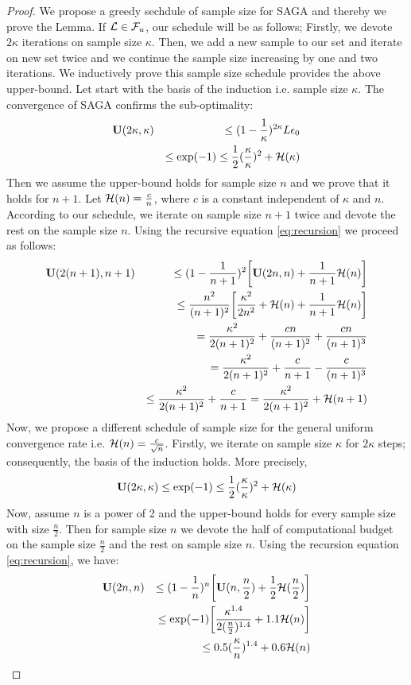 \begin{proof}
	We propose a greedy sechdule of sample size for SAGA and thereby we prove
	the Lemma. If ${\cal L} \in {\cal F}_{u}$, our schedule will be as follows;
	Firstly, we devote $2 \kappa$ iterations on sample size $\kappa$. Then, we
	add a new sample to our set and iterate on new set twice and we continue the
	sample size increasing by one and two iterations. We inductively prove this
	sample size schedule provides the above upper-bound. Let start with the basis
	of the induction i.e. sample size $\kappa$. The convergence of SAGA confirms
	the sub-optimality: 
	\begin{eqnarray*}
		& \mathbf U(2\kappa,\kappa) & \leq (1-\frac{1}{\kappa})^{2\kappa} L \epsilon_0 \\
		& & \leq \exp(-1) \leq \frac{1}{2}(\frac{\kappa}{\kappa})^2 + {\cal H}(\kappa)
	\end{eqnarray*}
	Then we assume the upper-bound holds for sample size $n$ and we prove that it
	holds for $n+1$. Let ${\cal H}(n) = \frac{c}{n}$, where $c$ is a constant
	independent of $\kappa$ and $n$. According to our schedule, we iterate on
	sample size $n+1$ twice and devote the rest on the sample size $n$. 
	Using the recursive equation \ref{eq:recursion} we proceed as follows:
	\begin{eqnarray*}
		& \mathbf U(2(n+1),n+1) & \leq (1-\frac{1}{n+1})^2 \bigg[ \mathbf U(2n,n) + \frac{1}{n+1}
		{\cal H}(n) \bigg] \\
		& & \leq \frac{n^2}{(n+1)^2} \bigg[ \frac{\kappa^2}{2 n^2} + {\cal H}(n)
		+ \frac{1}{n+1} {\cal H}(n) \bigg]
		\\
		& & = \frac{\kappa^2}{2 (n+1)^2} + \frac{c n}{(n+1)^2} + \frac{c n}{(n+1)^3}
		\\
		& & = \frac{\kappa^2}{2 (n+1)^2} + \frac{c}{n+1} -\frac{c}{(n+1)^3} \\
		& & \leq \frac{\kappa^2}{2 (n+1)^2} + \frac{c}{n+1} = \frac{\kappa^2}{2
		(n+1)^2} + {\cal H}(n+1)
	\end{eqnarray*}
	Now, we propose a different schedule of sample size for the general uniform
	convergence rate i.e. ${\cal H}(n) = \frac{c}{\sqrt{n}}$. Firstly, we iterate on
	sample size $\kappa$ for $2 \kappa$ steps; consequently, the basis of the induction
	holds. More precisely,
	\begin{equation*}
		\mathbf U(2\kappa,\kappa)  \leq \exp(-1) \leq \frac{1}{2} (\frac{\kappa}{\kappa})^2 +
		{\cal H}(\kappa)
	\end{equation*}
	Now, assume $n$ is a power of 2 and the upper-bound holds for every
	sample size with size $\frac{n}{2}$. Then for sample size $n$ we devote the
	half of computational budget on the sample size $\frac{n}{2}$ and the rest on
	sample size $n$. Using the recursion equation \ref{eq:recursion}, we have: 
	\begin{eqnarray*}
		& \mathbf U(2n,n) & \leq (1-\frac{1}{n})^{n} \bigg[ \mathbf U(n,\frac{n}{2}) + \frac{1}{2}
		{\cal H}(\frac{n}{2}) \bigg] \\
		& & \leq \exp(-1) \bigg[ \frac{\kappa^{1.4}}{2 (\frac{n}{2})^{1.4}} 
		+ 1.1 {\cal H}(n) \bigg]
		\\
		& & \leq  0.5 (\frac{\kappa}{n})^{1.4} + 0.6 {\cal H}(n)
	\end{eqnarray*}
\end{proof}
